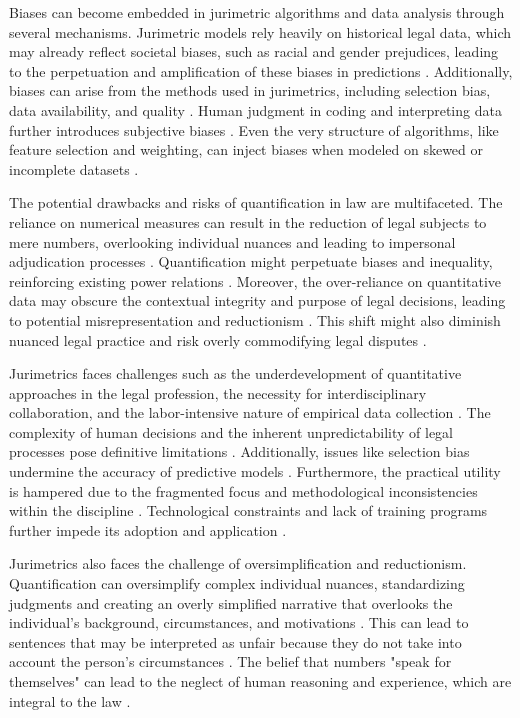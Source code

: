 Biases can become embedded in jurimetric algorithms and data analysis through several mechanisms. Jurimetric models rely heavily on historical legal data, which may already reflect societal biases, such as racial and gender prejudices, leading to the perpetuation and amplification of these biases in predictions \cite{gillborn2017, maia2019, saltelli2020}. Additionally, biases can arise from the methods used in jurimetrics, including selection bias, data availability, and quality \cite{ribeiro1998, ribeiro2021, silva2023}. Human judgment in coding and interpreting data further introduces subjective biases \cite{de2010, zabala1809}. Even the very structure of algorithms, like feature selection and weighting, can inject biases when modeled on skewed or incomplete datasets \cite{ribeiro2021, silva2023}.

The potential drawbacks and risks of quantification in law are multifaceted. The reliance on numerical measures can result in the reduction of legal subjects to mere numbers, overlooking individual nuances and leading to impersonal adjudication processes \cite{lynch2019}. Quantification might perpetuate biases and inequality, reinforcing existing power relations \cite{lynch2019}. Moreover, the over-reliance on quantitative data may obscure the contextual integrity and purpose of legal decisions, leading to potential misrepresentation and reductionism \cite{sareen2020, nunes2018}. This shift might also diminish nuanced legal practice and risk overly commodifying legal disputes \cite{ribeiro2021}.

Jurimetrics faces challenges such as the underdevelopment of quantitative approaches in the legal profession, the necessity for interdisciplinary collaboration, and the labor-intensive nature of empirical data collection \cite{de2010, nunes2018, ribeiro1998}. The complexity of human decisions and the inherent unpredictability of legal processes pose definitive limitations \cite{nunes2018, loevinger1949}. Additionally, issues like selection bias undermine the accuracy of predictive models \cite{ribeiro1998}. Furthermore, the practical utility is hampered due to the fragmented focus and methodological inconsistencies within the discipline \cite{nunes2018, loevinger1949}. Technological constraints and lack of training programs further impede its adoption and application \cite{colombo2017, nunes2018}.

Jurimetrics also faces the challenge of oversimplification and reductionism. Quantification can oversimplify complex individual nuances, standardizing judgments and creating an overly simplified narrative that overlooks the individual's background, circumstances, and motivations \cite{10.1007/s11186-021-09453-1,10.1057/s41599-020-00557-0}. This can lead to sentences that may be interpreted as unfair because they do not take into account the person's circumstances \cite{10.1590/dados.2022.65.3.267,10.32586/rcda.v18i1.585}. The belief that numbers "speak for themselves" can lead to the neglect of human reasoning and experience, which are integral to the law \cite{10.1590/dados.2022.65.3.267,10.32586/rcda.v18i1.585}.


